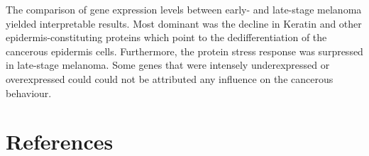 \documentclass[twoside]{article}
\begin{document}
The comparison of gene expression levels between early- and late-stage melanoma yielded interpretable results. Most dominant was the decline in Keratin and other epidermis-constituting proteins which point to the dedifferentiation of the cancerous epidermis cells. Furthermore, the protein stress response was surpressed in late-stage melanoma. Some genes that were intensely underexpressed or overexpressed could could not be attributed any influence on the cancerous behaviour.














\newpage
\section{References}


\end{document}
